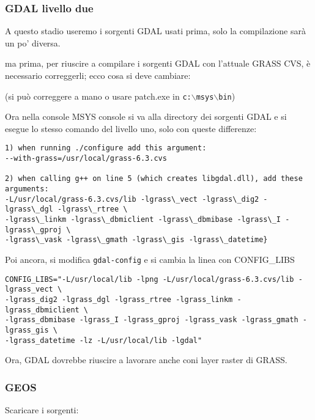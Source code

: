 \subsubsection{GDAL livello due}
A questo stadio useremo i sorgenti GDAL usati prima, solo la compilazione sarà un po' diversa.

ma prima, per riuscire a compilare i sorgenti GDAL con l'attuale GRASS CVS, è necessario correggerli; ecco cosa si deve cambiare:

	\begin{quotation}
	\end{quotation}
(si può correggere a mano o usare patch.exe in \texttt{c:$\backslash$msys$\backslash$bin})

Ora nella console MSYS console si va alla directory dei sorgenti GDAL e si esegue lo stesso comando del livello uno, solo con queste differenze:

\begin{verbatim}
1) when running ./configure add this argument:
--with-grass=/usr/local/grass-6.3.cvs

2) when calling g++ on line 5 (which creates libgdal.dll), add these arguments: 
-L/usr/local/grass-6.3.cvs/lib -lgrass\_vect -lgrass\_dig2 -lgrass\_dgl -lgrass\_rtree \
-lgrass\_linkm -lgrass\_dbmiclient -lgrass\_dbmibase -lgrass\_I -lgrass\_gproj \ 
-lgrass\_vask -lgrass\_gmath -lgrass\_gis -lgrass\_datetime}
\end{verbatim}

Poi ancora, si modifica \texttt{gdal-config} e si cambia la linea con CONFIG\_LIBS

\begin{verbatim}
CONFIG_LIBS="-L/usr/local/lib -lpng -L/usr/local/grass-6.3.cvs/lib -lgrass_vect \
-lgrass_dig2 -lgrass_dgl -lgrass_rtree -lgrass_linkm -lgrass_dbmiclient \
-lgrass_dbmibase -lgrass_I -lgrass_gproj -lgrass_vask -lgrass_gmath -lgrass_gis \
-lgrass_datetime -lz -L/usr/local/lib -lgdal" 
\end{verbatim}

Ora, GDAL dovrebbe riuscire a lavorare anche coni layer raster di GRASS.

\subsubsection{GEOS}
Scaricare i sorgenti:

